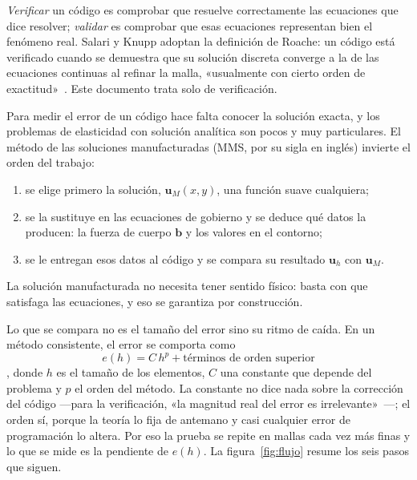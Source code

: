 \documentclass[11pt,a4paper]{article}
\newcommand{\uM}{\bm{u}_M}
\begin{document}
\emph{Verificar} un código es comprobar que resuelve correctamente las ecuaciones que dice
resolver; \emph{validar} es comprobar que esas ecuaciones representan bien el fenómeno real.
Salari y Knupp adoptan la definición de Roache: un código está verificado cuando se demuestra que
su solución discreta converge a la de las ecuaciones continuas al refinar la malla, «usualmente con
cierto orden de exactitud»~\cite[p.~11]{salari}. Este documento trata solo de verificación.

Para medir el error de un código hace falta conocer la solución exacta, y los problemas de
elasticidad con solución analítica son pocos y muy particulares. El método de las soluciones
manufacturadas (MMS, por su sigla en inglés) invierte el orden del trabajo:

\begin{enumerate}[leftmargin=1.6em]
  \item se elige primero la solución, $\uM(x,y)$, una función suave cualquiera;
  \item se la sustituye en las ecuaciones de gobierno y se deduce qué datos la producen: la fuerza
    de cuerpo $\bm b$ y los valores en el contorno;
  \item se le entregan esos datos al código y se compara su resultado $\bm u_h$ con $\uM$.
\end{enumerate}

La solución manufacturada no necesita tener sentido físico: basta con que satisfaga las
ecuaciones, y eso se garantiza por construcción.

Lo que se compara no es el tamaño del error sino su ritmo de caída. En un método consistente, el
error se comporta como
\begin{equation}\label{eq:orden}
  e(h) = C\,h^{p} + \text{términos de orden superior}
\end{equation}
\cite[p.~29]{salari}, donde $h$ es el tamaño de los elementos, $C$ una constante que depende del
problema y $p$ el orden del método. La constante no dice nada sobre la corrección del código
---para la verificación, «la magnitud real del error es irrelevante»~\cite[p.~28]{salari}---;
el orden sí, porque la teoría lo fija de antemano y casi cualquier error de programación lo
altera. Por eso la prueba se repite en mallas cada vez más finas y lo que se mide es la pendiente
de $e(h)$. La figura~\ref{fig:flujo} resume los seis pasos que siguen.
\end{document}
